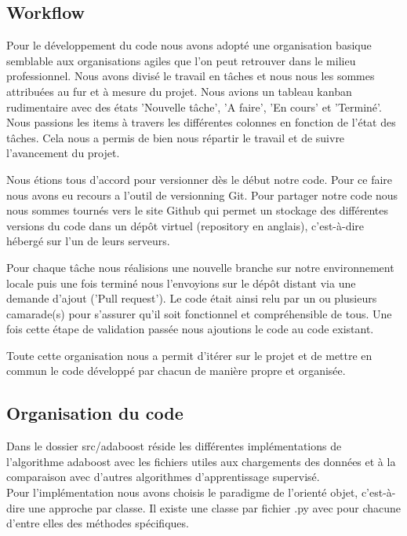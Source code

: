 \documentclass{article}
\begin{document}
\subsection{Workflow}

Pour le développement du code nous avons adopté une organisation basique semblable aux organisations agiles que l'on peut retrouver dans le milieu professionnel. 
Nous avons divisé le travail en tâches et nous nous les sommes attribuées au fur et à mesure du projet. Nous avions un tableau kanban rudimentaire avec des états 'Nouvelle tâche', 'A faire', 'En cours' et 'Terminé'. Nous passions les items à travers les différentes colonnes en fonction de l'état des tâches. Cela nous a permis de bien nous répartir le travail et de suivre l'avancement du projet. 

Nous étions tous d'accord pour versionner dès le début notre code. Pour ce faire nous avons eu recours a l'outil de versionning Git. 
Pour partager notre code nous nous sommes tournés vers le site Github qui permet un stockage des différentes versions du code dans un dépôt virtuel (repository en anglais), c'est-à-dire hébergé sur l'un de leurs serveurs.

Pour chaque tâche nous réalisions une nouvelle branche sur notre environnement locale puis une fois terminé nous l'envoyions sur le dépôt distant via une demande d'ajout ('Pull request'). 
Le code était ainsi relu par un ou plusieurs camarade(s) pour s'assurer qu'il soit fonctionnel et compréhensible de tous. Une fois cette étape de validation passée nous ajoutions le code au code existant. 

Toute cette organisation nous a permit d'itérer sur le projet et de mettre en commun le code développé par chacun de manière propre et organisée. 

\subsection{Organisation du code}

Dans le dossier src/adaboost réside les différentes implémentations de l'algorithme adaboost avec les fichiers utiles aux chargements des données et à la comparaison avec d'autres algorithmes d'apprentissage supervisé.\\

Pour l'implémentation nous avons choisis le paradigme de l'orienté objet, c'est-à-dire une approche par classe. Il existe une classe par fichier .py avec pour chacune d'entre elles des méthodes spécifiques. \\
\end{document}
